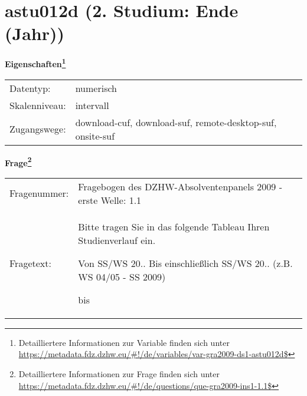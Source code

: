 
    \setcounter{footnote}{0}

    \vspace*{-1.8cm}
	\section{astu012d (2. Studium: Ende (Jahr))}
	\label{section:astu012d}



    \vspace*{0.5cm}
    \noindent\textbf{Eigenschaften\footnote{Detailliertere Informationen zur Variable finden sich unter
		\url{https://metadata.fdz.dzhw.eu/\#!/de/variables/var-gra2009-ds1-astu012d$}}}\\
	\begin{tabularx}{\hsize}{@{}lX}
	Datentyp: & numerisch \\
	Skalenniveau: & intervall \\
	Zugangswege: &
	  download-cuf, 
	  download-suf, 
	  remote-desktop-suf, 
	  onsite-suf
 \\
    \end{tabularx}



				\vspace*{0.5cm}
                \noindent\textbf{Frage\footnote{Detailliertere Informationen zur Frage finden sich unter
		              \url{https://metadata.fdz.dzhw.eu/\#!/de/questions/que-gra2009-ins1-1.1$}}}\\
				\begin{tabularx}{\hsize}{@{}lX}
					Fragenummer: &
					  Fragebogen des DZHW-Absolventenpanels 2009 - erste Welle:
					  1.1
 \\
					Fragetext: & Bitte tragen Sie in das folgende Tableau Ihren Studienverlauf ein.\par  Von SS/WS 20.. Bis einschließlich SS/WS 20.. (z.B. WS 04/05 - SS 2009)\par  bis \\
				\end{tabularx}





